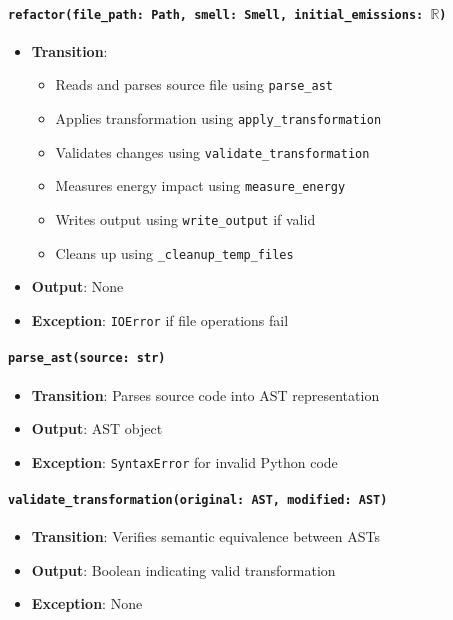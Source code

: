 \documentclass[12pt, titlepage]{article}
\begin{document}
\paragraph{\texttt{refactor(file\_path: Path, smell: Smell, initial\_emissions: $\mathbb{R}$)}}
\begin{itemize}
  \item \textbf{Transition}:
    \begin{itemize}
      \item Reads and parses source file using \texttt{parse\_ast}
      \item Applies transformation using \texttt{apply\_transformation}
      \item Validates changes using \texttt{validate\_transformation}
      \item Measures energy impact using \texttt{measure\_energy}
      \item Writes output using \texttt{write\_output} if valid
      \item Cleans up using \texttt{\_cleanup\_temp\_files}
    \end{itemize}
  \item \textbf{Output}: None
  \item \textbf{Exception}: \texttt{IOError} if file operations fail
\end{itemize}

\paragraph{\texttt{parse\_ast(source: str)}}
\begin{itemize}
  \item \textbf{Transition}: Parses source code into AST representation
  \item \textbf{Output}: AST object
  \item \textbf{Exception}: \texttt{SyntaxError} for invalid Python code
\end{itemize}

\paragraph{\texttt{validate\_transformation(original: AST, modified: AST)}}
\begin{itemize}
  \item \textbf{Transition}: Verifies semantic equivalence between ASTs
  \item \textbf{Output}: Boolean indicating valid transformation
  \item \textbf{Exception}: None
\end{itemize}
\end{document}
